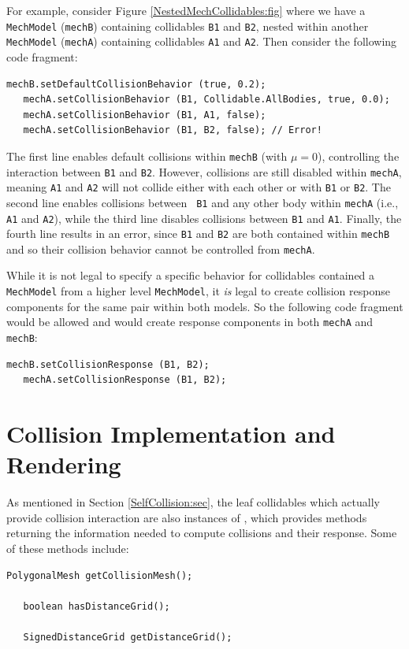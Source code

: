 For example, consider Figure \ref{NestedMechCollidables:fig} where we
have a {\tt MechModel} ({\tt mechB}) containing collidables {\tt B1} and
{\tt B2}, nested within another {\tt MechModel} ({\tt mechA})
containing collidables {\tt A1} and {\tt A2}. Then consider the
following code fragment:
%
\begin{lstlisting}[]
   mechB.setDefaultCollisionBehavior (true, 0.2);
   mechA.setCollisionBehavior (B1, Collidable.AllBodies, true, 0.0);
   mechA.setCollisionBehavior (B1, A1, false);
   mechA.setCollisionBehavior (B1, B2, false); // Error!
\end{lstlisting}
%
The first line enables default collisions within {\tt mechB} (with
$\mu = 0$), controlling the interaction between {\tt B1} and {\tt B2}.
However, collisions are still disabled within {\tt mechA}, meaning
{\tt A1} and {\tt A2} will not collide either with each other or with
{\tt B1} or {\tt B2}.  The second line enables collisions between {\tt
B1} and any other body within {\tt mechA} (i.e., {\tt A1} and
{\tt A2}), while the third line disables collisions between {\tt B1}
and {\tt A1}.  Finally, the fourth line results in an error, since
{\tt B1} and {\tt B2} are both contained within {\tt mechB} and so
their collision behavior cannot be controlled from {\tt mechA}.

While it is not legal to specify a specific behavior for collidables
contained a {\tt MechModel} from a higher level {\tt MechModel},
it {\it is} legal to create collision response components for the same
pair within both models. So the following code fragment would be
allowed and would create response components in both {\tt mechA} and
{\tt mechB}:
%
\begin{lstlisting}[]
   mechB.setCollisionResponse (B1, B2);
   mechA.setCollisionResponse (B1, B2);
\end{lstlisting}
%

\section{Collision Implementation and Rendering}
\label{CollisionImplemenetation:sec}

As mentioned in Section \ref{SelfCollision:sec}, the leaf collidables
which actually provide collision interaction are also instances of
, which provides methods
returning the information needed to compute collisions and their
response. Some of these methods include:

%
\begin{lstlisting}[]
   PolygonalMesh getCollisionMesh();

   boolean hasDistanceGrid();

   SignedDistanceGrid getDistanceGrid();
\end{lstlisting}
%

